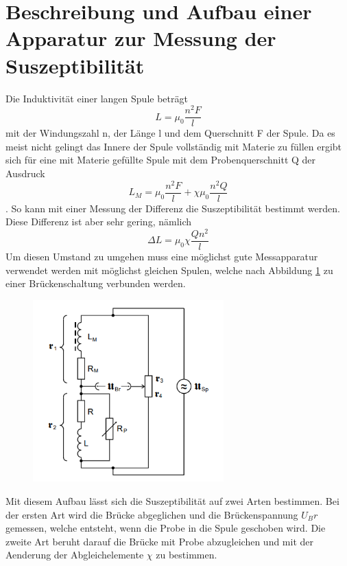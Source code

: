 \section{Beschreibung und Aufbau einer Apparatur zur Messung der Suszeptibilität}
Die Induktivität einer langen Spule beträgt  
\begin{equation}
    L=\mu_0\frac{n^2F}{l} \label{21}
\end{equation} 
mit der Windungszahl n, der Länge l und dem Querschnitt F der Spule. Da es meist nicht gelingt das Innere der Spule vollständig mit Materie zu füllen ergibt sich für eine mit Materie gefüllte Spule mit dem Probenquerschnitt Q der Ausdruck
\begin{equation*}
    L_M=\mu_0\frac{n^2F}{l}+\chi\mu_0\frac{n^2Q}{l} 
\end{equation*}.
So kann mit einer Messung der Differenz die Suszeptibilität bestimmt werden. Diese Differenz ist aber sehr gering, nämlich 
\begin{equation}
    \Delta L=\mu_0\chi\frac{Qn^2}{l} \label{22}
\end{equation}
Um diesen Umstand zu umgehen muss eine möglichst gute Messapparatur verwendet werden mit möglichst gleichen Spulen, welche nach Abbildung \ref{Fig:Bruecke} zu einer Brückenschaltung verbunden werden. 
\begin{figure}[H]
    \centering
    \captionsetup{justification=centering}
    \includegraphics[height=7cm]{"Bruecke_Paramagnetismus.png"}
    \label{Fig:Bruecke}
\end{figure}
Mit diesem Aufbau lässt sich die Suszeptibilität auf zwei Arten bestimmen. Bei der ersten Art wird die Brücke abgeglichen und die Brückenspannung $U_Br$ gemessen, welche entsteht, wenn die Probe in die Spule geschoben wird. Die zweite Art beruht darauf die Brücke mit Probe abzugleichen und mit der Aenderung der Abgleichelemente $\chi$ zu bestimmen.\\
